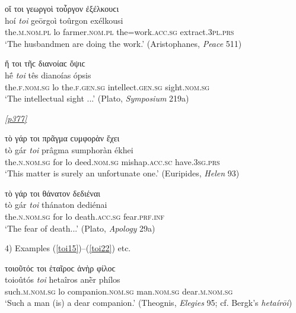 \begin{exe}
\ex οἵ τοι γεωργοὶ τοὖργον ἐξέλκουϲι\\
\gll hoí \emph{toi} geōrgoì toûrgon exélkousi\\
the.\textsc{m.nom.pl} lo farmer.\textsc{nom.pl} the=work.\textsc{acc.sg} extract.\textsc{3pl.prs}\\
\trans `The husbandmen are doing the work.' (Aristophanes, \textit{Peace} 511)
\label{toi11}
\end{exe}

\begin{exe}
\ex ἥ τοι τῆϲ διανοίαϲ ὄψιϲ\\
\gll hḗ \emph{toi} tês dianoías ópsis\\
the.\textsc{f.nom.sg} lo the.\textsc{f.gen.sg} intellect.\textsc{gen.sg} sight.\textsc{nom.sg}\\
\trans `The intellectual sight ...' (Plato, \textit{Symposium} 219a)
\label{toi12}
\end{exe}

\hyperlink{p377}{\emph{[p377]}}

\begin{exe}
\ex τὸ γάρ τοι πρᾶγμα ϲυμφορὰν ἔχει\\
\gll tò gár \emph{toi} prâgma sumphoràn ékhei\\
the.\textsc{n.nom.sg} for lo deed.\textsc{nom.sg} mishap.\textsc{acc.sc} have.\textsc{3sg.prs}\\
\trans `This matter is surely an unfortunate one.' (Euripides, \textit{Helen} 93)
\label{toi13}
\end{exe}

\begin{exe}
\ex τὸ γάρ τοι θάνατον δεδιέναι\\
\gll tò gár \emph{toi} thánaton dediénai\\
the.\textsc{n.nom.sg} for lo death.\textsc{acc.sg}
fear.\textsc{prf.inf}\\
\trans `The fear of death...' (Plato, \textit{Apology} 29a)
\label{toi14}
\end{exe}

4) Examples (\ref{toi15})--(\ref{toi22}) etc.

\begin{exe}
\ex τοιοῦτόϲ τοι ἑταῖροϲ ἀνὴρ φίλοϲ\\
\gll toioûtós \emph{toi} hetaîros anḕr phílos\\
such.\textsc{m.nom.sg} lo companion.\textsc{nom.sg} man.\textsc{nom.sg} dear.\textsc{m.nom.sg}\\
\trans `Such a man (is) a dear companion.' (Theognis, \textit{Elegies} 95; cf. Bergk's \textit{hetaírōi})
\label{toi15}
\end{exe}


